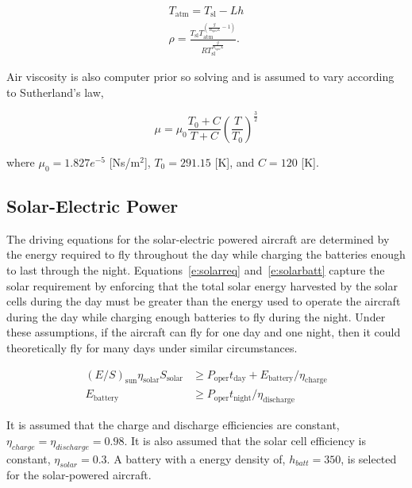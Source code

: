 \documentclass[]{aiaa-tc}%
\begin{document}
\begin{align}
    \label{e:Talt}
    T_{\text{atm}} = T_{\text{sl}} - Lh \\
    \label{e:rhot}
    \rho = \frac{T_{\text{sl}}T_{\text{atm}}^{\left( \frac{g}{R_{\text{spec}}L} -1 \right)}}{R T_{\text{sl}}^{\frac{g}{R_{\text{spec}}L}}}.
\end{align}

Air viscosity is also computer prior so solving and is assumed to vary according to Sutherland's law, 

\begin{equation}
    \label{e:sutherland}
    \mu = \mu_0 \frac{T_0 + C}{T+C} \left( \frac{T}{T_0} \right)^{\frac{3}{2}}
\end{equation}

where $\mu_0 = 1.827e^{-5}$ [Ns/m$^2$], $T_0 = 291.15$ [K], and $C = 120$ [K].

\subsection{Solar-Electric Power}

The driving equations for the solar-electric powered aircraft are determined by the energy required to fly throughout the day while charging the batteries enough to last through the night.  
Equations~\ref{e:solarreq} and~\ref{e:solarbatt} capture the solar requirement by enforcing that the total solar energy harvested by the solar cells during the day must be greater than the energy used to operate the aircraft during the day while charging enough batteries to fly during the night. 
Under these assumptions, if the aircraft can fly for one day and one night, then it could theoretically fly for many days under similar circumstances. 

    \begin{align}
        \label{e:solarreq}
        (E/S)_{\text{sun}} \eta_{\text{solar}} S_{\text{solar}} &\geq P_{\text{oper}}t_{\text{day}} + E_{\text{battery}}/\eta_{\text{charge}} \\
        \label{e:solarbatt}
        E_{\text{battery}} &\geq P_{\text{oper}}t_{\text{night}}/\eta_{\text{discharge}}
    \end{align}
    
    It is assumed that the charge and discharge efficiencies are constant, $\eta_{charge} = \eta_{discharge} = 0.98$. It is also assumed that the solar cell efficiency is constant, $\eta_{solar} = 0.3$. A battery with a energy density of, $h_{batt} = 350$, is selected for the solar-powered aircraft. 
\end{document}
